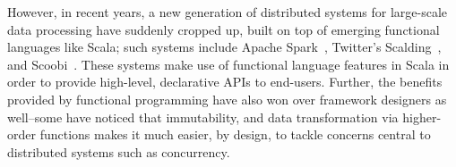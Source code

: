\documentclass[10pt]{sigplanconf}
\theoremstyle{definition}
\theoremstyle{definition}
\newcommand{\fixme}[1]{{\color{gray}\itshape#1}}
\begin{document}
However, in recent years, a new generation of distributed systems for
large-scale data processing have suddenly cropped up, built on top of emerging
functional languages like Scala; such systems include Apache Spark~\cite{Spark},
Twitter's Scalding~\cite{Scalding}, and Scoobi~\cite{Scoobi}. These systems make
use of functional language features in Scala in order to provide high-level,
declarative APIs to end-users. Further, the benefits provided by functional
programming have also won over framework designers as well--some have noticed
that immutability, and data transformation via higher-order functions makes it
much easier, by design, to tackle concerns central to distributed systems such
as concurrency.




%
%
%
%
\end{document}
